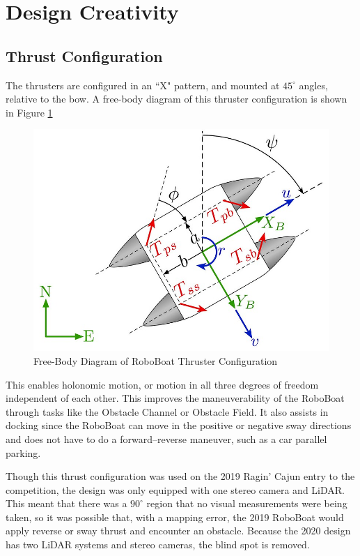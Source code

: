 \documentclass[letterpaper, 12 pt, conference]{ieeeconf}
\begin{document}
\section{Design Creativity}
\subsection{Thrust Configuration}
The thrusters are configured in an ``X" pattern, and mounted at $45^\circ$ angles, relative to the bow. A free-body diagram of this thruster configuration is shown in Figure \ref{fig:FBD}
%
\begin{figure}[tb]
\centering
\vspace{0.05in}
\includegraphics[width=\columnwidth]{Figures/FBD.jpg}
\caption{Free-Body Diagram of RoboBoat Thruster Configuration}
\label{fig:FBD}
\end{figure}
%
This enables holonomic motion, or motion in all three degrees of freedom independent of each other. This improves the maneuverability of the RoboBoat through tasks like the Obstacle Channel or Obstacle Field. It also assists in docking since the RoboBoat can move in the positive or negative sway directions and does not have to do a forward--reverse maneuver, such as a car parallel parking.

Though this thrust configuration was used on the 2019 Ragin' Cajun entry to the competition, the design was only equipped with one stereo camera and LiDAR. This meant that there was a $90^\circ$ region that no visual measurements were being taken, so it was possible that, with a mapping error, the 2019 RoboBoat would apply reverse or sway thrust and encounter an obstacle. Because the 2020 design has two LiDAR systems and stereo cameras, the blind spot is removed.
\end{document}
